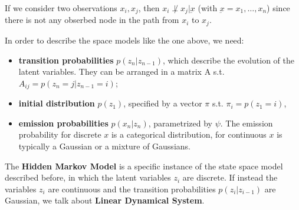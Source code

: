 \begin{center}
\end{center}

If we consider two observations $x_i, x_j$, then $x_i \not\perp x_j|\underbar{x}$ (with $\underbar{x} = x_1, \dots, x_n$) since there is not any obserbed node in the path from $x_i$ to $x_j$.

In order to describe the space models like the one above, we need:
\begin{itemize}
    \item \textbf{transition probabilities} $p(z_n|z_{n-1})$, which describe the evolution of the latent variables. They can be arranged in a matrix A s.t. $A_{ij} = p(z_n = j|z_{n-1} = i)$;
    \item \textbf{initial distribution} $p(z_1)$, specified by a vector $\pi$ s.t. $\pi_i = p(z_1 = i)$,
    \item \textbf{emission probabilities} $p(x_n|z_n)$, parametrized by $\psi$. The emission probability for discrete $x$ is a categorical distribution, for continuous $x$ is typically a Gaussian or a mixture of Gaussians.
\end{itemize}

\begin{definitionblock}
    The \textbf{Hidden Markov Model} is a specific instance of the state space model described before, in which the latent variables $z_i$ are discrete. If instead the variables $z_i$ are continuous and the transition probabilities $p(z_i|z_{i-1})$ are Gaussian, we talk about \textbf{Linear Dynamical System}.
\end{definitionblock}

